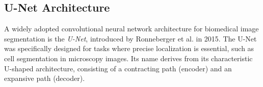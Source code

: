 






\subsection{U-Net Architecture}

A widely adopted convolutional neural network architecture for biomedical image segmentation is the \textit{U-Net}, introduced by Ronneberger et al. in 2015. The U-Net was specifically designed for tasks where precise localization is essential, such as cell segmentation in microscopy images. Its name derives from its characteristic U-shaped architecture, consisting of a contracting path (encoder) and an expansive path (decoder).

